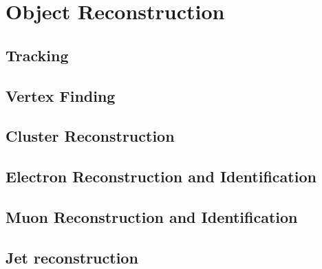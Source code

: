 \graphicspath{{Chapters/Reconstruction/Figures/}}
\chapter{Object Reconstruction}
\label{chap:Reconstruction}

\section{Tracking}
\section{Vertex Finding}
\section{Cluster Reconstruction}
\section{Electron Reconstruction and Identification}
\section{Muon Reconstruction and Identification}
\section{Jet reconstruction}
